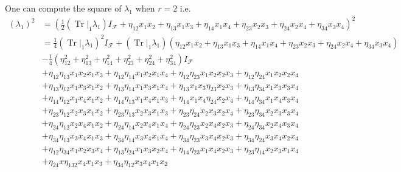 \documentclass[aps, preprint]{revtex4}
\begin{document}
One can compute the square of $\lambda _{1}$ when $r =2$ i.e.
\begin{align*}\left (\lambda _{1}\right )^{2} &  =\left (\frac{1}{2} \left (\left .\ensuremath{\operatorname*{Tr}}\right \vert _{1} \lambda _{1}\right ) I_{\mathcal{F}} +\eta _{1 2} x_{1} x_{2} +\eta _{1 3} x_{1} x_{3} +\eta _{1 4} x_{1} x_{4} +\eta _{2 3} x_{2} x_{3} +\eta _{2 4} x_{2} x_{4} +\eta _{3 4} x_{3} x_{4}\right )^{2} \\
 &  =\frac{1}{4} \left (\left .\ensuremath{\operatorname*{Tr}}\right \vert _{1} \lambda _{1}\right )^{2} I_{\mathcal{F}} +\left (\left .\ensuremath{\operatorname*{Tr}}\right \vert _{1} \lambda _{1}\right ) \left (\eta _{1 2} x_{1} x_{2} +\eta _{1 3} x_{1} x_{3} +\eta _{1 4} x_{1} x_{4} +\eta _{2 3} x_{2} x_{3} +\eta _{2 4} x_{2} x_{4} +\eta _{3 4} x_{3} x_{4}\right ) \\
 &  -\frac{1}{4} \left (\eta _{1 2}^{2} +\eta _{1 3}^{2} +\eta _{1 4}^{2} +\eta _{2 3}^{2} +\eta _{2 4}^{2} +\eta _{3 4}^{2}\right ) I_{\mathcal{F}} \\
 &  +\eta _{1 2} \eta _{1 3} x_{1} x_{2} x_{1} x_{3} +\eta _{1 2} \eta _{1 4} x_{1} x_{2} x_{1} x_{4} +\eta _{1 2} \eta _{2 3} x_{1} x_{2} x_{2} x_{3} +\eta _{1 2} \eta _{2 4} x_{1} x_{2} x_{2} x_{4} \\
 &  +\eta _{1 3} \eta _{1 2} x_{1} x_{3} x_{1} x_{2} +\eta _{1 3} \eta _{1 4} x_{1} x_{3} x_{1} x_{4} +\eta _{1 3} x_{1} x_{3} \eta _{2 3} x_{2} x_{3} +\eta _{1 3} \eta _{3 4} x_{1} x_{3} x_{3} x_{4} \\
 &  +\eta _{1 4} \eta _{1 2} x_{1} x_{4} x_{1} x_{2} +\eta _{1 4} \eta _{1 3} x_{1} x_{4} x_{1} x_{3} +\eta _{1 4} x_{1} x_{4} \eta _{2 4} x_{2} x_{4} +\eta _{1 4} \eta _{3 4} x_{1} x_{4} x_{3} x_{4} \\
 &  +\eta _{2 3} \eta _{1 2} x_{2} x_{3} x_{1} x_{2} +\eta _{2 3} \eta _{1 3} x_{2} x_{3} x_{1} x_{3} +\eta _{2 3} \eta _{2 4} x_{2} x_{3} x_{2} x_{4} +\eta _{2 3} \eta _{3 4} x_{2} x_{3} x_{3} x_{4} \\
 &  +\eta _{2 4} \eta _{1 2} x_{2} x_{4} x_{1} x_{2} +\eta _{2 4} \eta _{1 4} x_{2} x_{4} x_{1} x_{4} +\eta _{2 4} \eta _{2 3} x_{2} x_{4} x_{2} x_{3} +\eta _{2 4} \eta _{3 4} x_{2} x_{4} x_{3} x_{4} \\
 &  +\eta _{3 4} \eta _{1 3} x_{3} x_{4} x_{1} x_{3} +\eta _{3 4} \eta _{1 4} x_{3} x_{4} x_{1} x_{4} +\eta _{3 4} \eta _{2 3} x_{3} x_{4} x_{2} x_{3} +\eta _{3 4} \eta _{2 4} x_{3} x_{4} x_{2} x_{4} \\
 &  +\eta _{1 2} \eta _{3 4} x_{1} x_{2} x_{3} x_{4} +\eta _{1 3} \eta _{2 4} x_{1} x_{3} x_{2} x_{4} +\eta _{1 4} \eta _{2 3} x_{1} x_{4} x_{2} x_{3} +\eta _{2 3} \eta _{1 4} x_{2} x_{3} x_{1} x_{4} \\
 &  +\eta _{2 4} x \eta _{1 3 2} x_{4} x_{1} x_{3} +\eta _{3 4} \eta _{1 2} x_{3} x_{4} x_{1} x_{2}\end{align*}
\end{document}
